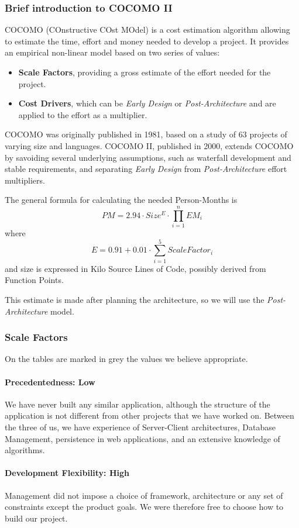 \subsubsection{Brief introduction to COCOMO II}
COCOMO (COnstructive COst MOdel) is a cost estimation algorithm allowing to estimate the time, effort and money needed to develop a project. It provides an empirical non-linear model based on two series of values:
\begin{itemize}
	\item\textbf{Scale Factors}, providing a gross estimate of the effort needed for the project.
	\item\textbf{Cost Drivers}, which can be \textit{Early Design} or \textit{Post-Architecture} and are applied to the effort as a multiplier.
\end{itemize}
COCOMO was originally published in 1981, based on a study of 63 projects of varying size and languages. COCOMO II, published in 2000, extends COCOMO by savoiding several underlying assumptions, such as waterfall development and stable requirements, and separating \textit{Early Design} from \textit{Post-Architecture} effort multipliers.

The general formula for calculating the needed Person-Months is $$ PM = 2.94 \cdot Size^E \cdot \prod_{i=1}^{n} EM_i $$ where $$ E = 0.91 + 0.01 \cdot \sum_{i=1}^{5}ScaleFactor_i $$ and size is expressed in Kilo Source Lines of Code, possibly derived from Function Points.

This estimate is made after planning the architecture, so we will use the \textit{Post-Architecture} model.

\subsubsection{Scale Factors}
On the tables are marked in grey the values we believe appropriate.
\paragraph*{Precedentedness: Low}
We have never built any similar application, although the structure of the application is not different from other projects that we have worked on. Between the three of us, we have experience of Server-Client architectures, Database Management, persistence in web applications, and an extensive knowledge of algorithms.

\paragraph*{Development Flexibility: High}
Management did not impose a choice of framework, architecture or any set of constraints except the product goals. We were therefore free to choose how to build our project.

